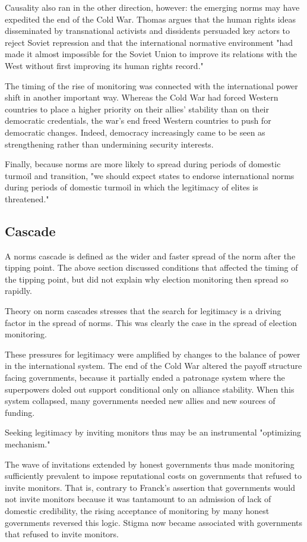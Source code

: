 Causality also ran in the other direction, however: the emerging norms may have expedited the end of the Cold War. Thomas argues that the human rights ideas disseminated by transnational activists and dissidents persuaded key actors to reject Soviet repression and that the international normative environment "had made it almost impossible for the Soviet Union to improve its relations with the West without first improving its human rights record."

The timing of the rise of monitoring was connected with the international power shift in another important way. Whereas the Cold War had forced Western countries to place a higher priority on their allies' stability than on their democratic credentials, the war's end freed Western countries to push for democratic changes. Indeed, democracy increasingly came to be seen as strengthening rather than undermining security interests.

Finally, because norms are more likely to spread during periods of domestic turmoil and transition, "we should expect states to endorse international norms during periods of domestic turmoil in which the legitimacy of elites is threatened."

\subsection{Cascade}
A norms cascade is defined as the wider and faster spread of the norm after the tipping point. The above section discussed conditions that affected the timing of the tipping point, but did not explain why election monitoring then spread so rapidly.

Theory on norm cascades stresses that the search for legitimacy is a driving factor in the spread of norms. This was clearly the case in the spread of election monitoring.

These pressures for legitimacy were amplified by changes to the balance of power in the international system. The end of the Cold War altered the payoff structure facing governments, because it partially ended a patronage system where the superpowers doled out support conditional only on alliance stability. When this system collapsed, many governments needed new allies and new sources of funding.

Seeking legitimacy by inviting monitors thus may be an instrumental "optimizing mechanism."

The wave of invitations extended by honest governments thus made monitoring sufficiently prevalent to impose reputational costs on governments that refused to invite monitors. That is, contrary to Franck's assertion that governments would not invite monitors because it was tantamount to an admission of lack of domestic credibility, the rising acceptance of monitoring by many honest governments reversed this logic. Stigma now became associated with governments that refused to invite monitors.

